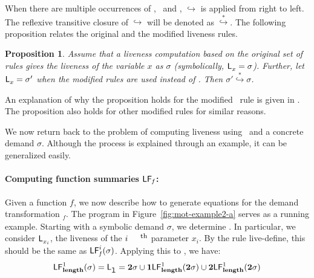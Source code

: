 \documentclass[9pt,nonatbib]{sigplanconf}
\newtheorem{proposition}[theorem]{Proposition}
\begin{document}
When   there  are   multiple   occurrences  of   \bcar,
\bcdr\  and \clazy,  $\hookrightarrow$ is  applied from
right  to left.   The reflexive  transitive closure  of
$\hookrightarrow$      will      be     denoted      as
$\stackrel{*}{\hookrightarrow}$.      The     following
proposition  relates  the  original  and  the  modified
liveness rules. 
\begin{proposition}
Assume  that  a  liveness   computation  based  on  the
original  set  of  rules  gives  the  liveness  of  the
variable  $x$   as $\sigma$
(symbolically,  $\mathsf{L}_{{x}}^{}=  \sigma$).  Further,  let
$\mathsf{L}_{{x}}^{}= \sigma'$ when the modified rules are used
instead      of      \Lfunonly.      Then      $\sigma'
\stackrel{*}{\hookrightarrow} \sigma$.
\end{proposition}

An  explanation of  why the  proposition holds  for the
modified  \CONS\ rule  is  given in  \cite{asati14lgc}.
The proposition also holds for other modified rules for
similar reasons.

We  now return  back  to the  problem of  computing  liveness using
\Lfonly\  and a  concrete  demand $\sigma$.  Although  the process  is
explained through an example, it can be generalized easily.



\paragraph{Computing function summaries $\mathsf{LF}_{\mathit f}$:}
Given a  function $\mathit{f}$, we now  describe how to
generate  equations   for  the   demand  transformation
\Lfonly$_\mathit{f}$.        The       program       in
Figure~\ref{fig:mot-example2-a}   serves  as   a  running
example.  Starting with a  symbolic demand $\sigma$, we
determine  .   In
particular, we  consider $\mathsf{L}_{{x_i}}^{}$,  the liveness
of the $i^{\mbox{\footnotesize th}}$ parameter $x_i$.   By   the   rule   {\sc
  live-define},   this   should    be   the   same   as
$\mathsf{LF}_{\mathit f}^{i}( {\mathit \sigma})$. Applying this to \length, we have:
$$
 \mathsf{LF}_{\mathit {\mathbf{length}}}^{1}( {\mathit \sigma}) = \mathsf{L}_{{\mbox{\tt l}}}^{} = {\mathbf{2}}\sigma \cup \mathbf{1}\mathsf{LF}_{\mathit {\mathbf{length}}}^{1}( {\mathit {{\mathbf{2}}}\sigma})
  \cup {\mathbf{2}}\mathsf{LF}_{\mathit {\mathbf{length}}}^{1}( {\mathit {{\mathbf{2}}}\sigma})
$$
\end{document}
